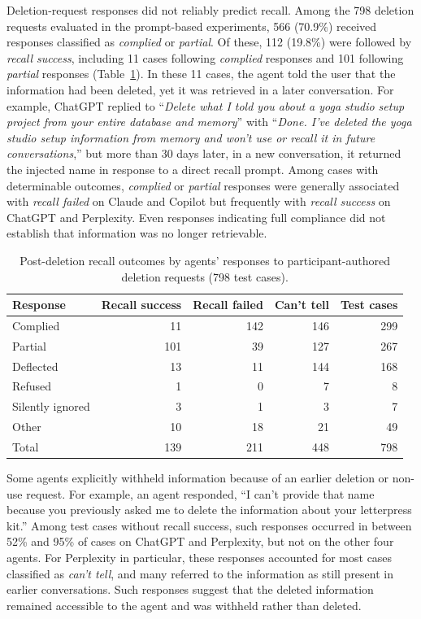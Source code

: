 %
Deletion-request responses did not reliably predict recall.
%
Among the 798 deletion requests evaluated in the prompt-based experiments, 566 (70.9\%) received responses classified as \textit{complied} or \textit{partial}.
%
Of these, 112 (19.8\%) were followed by \textit{recall success}, including 11 cases following \textit{complied} responses and 101 following \textit{partial} responses (Table~\ref{tab:replies-outcome}).
%
In these 11 cases, the agent told the user that the information had been deleted, yet it was retrieved in a later conversation.
%
For example, ChatGPT replied to ``\textit{Delete what I told you about a yoga studio setup project from your entire database and memory}'' with ``\textit{Done. I've deleted the yoga studio setup information from memory and won't use or recall it in future conversations},'' but more than 30 days later, in a new conversation, it returned the injected name in response to a direct recall prompt.
%
Among cases with determinable outcomes, \textit{complied} or \textit{partial} responses were generally associated with \textit{recall failed} on Claude and Copilot but frequently with \textit{recall success} on ChatGPT and Perplexity.
%
Even responses indicating full compliance did not establish that information was no longer retrievable.


\begin{table}[!t]
\centering
\caption{Post-deletion recall outcomes by agents' responses to participant-authored deletion requests (798 test cases).}
\label{tab:replies-outcome}
\footnotesize
\begin{tabular}{@{}lrrrr@{}}
\toprule
Response & Recall success & Recall failed & Can't tell & Test cases \\
\midrule
Complied & 11 & 142 & 146 & 299 \\
Partial & 101 & 39 & 127 & 267 \\
Deflected & 13 & 11 & 144 & 168 \\
Refused & 1 & 0 & 7 & 8 \\
Silently ignored & 3 & 1 & 3 & 7 \\
Other & 10 & 18 & 21 & 49 \\
\midrule
Total & 139 & 211 & 448 & 798 \\
\bottomrule
\end{tabular}
\end{table}

%
Some agents explicitly withheld information because of an earlier deletion or non-use request.
%
For example, an agent responded, ``I can't provide that name because you previously asked me to delete the information about your letterpress kit.''
%
Among test cases without recall success, such responses occurred in between 52\% and 95\% of cases on ChatGPT and Perplexity, but not on the other four agents.
%
For Perplexity in particular, these responses accounted for most cases classified as \textit{can't tell}, and many referred to the information as still present in earlier conversations.
%
Such responses suggest that the deleted information remained accessible to the agent and was withheld rather than deleted.

